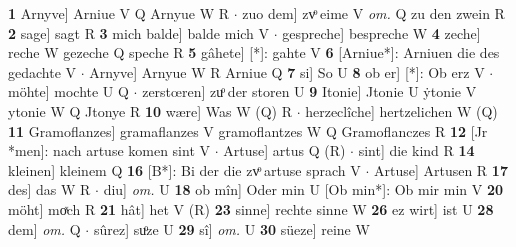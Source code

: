 \documentclass[8pt,a4paper,notitlepage]{article}
\begin{document}
\begin{table}[ht]
\begin{minipage}[t]{0.5\linewidth}
\textbf{1} Arnyve] Arniue V Q Arnyue W R  $\cdot$ zuo dem] zvͦ eime V \textit{om.} Q zu den zwein R \textbf{2} sage] sagt R \textbf{3} mich balde] balde mich V  $\cdot$ gespreche] bespreche W \textbf{4} zeche] reche W gezeche Q speche R \textbf{5} gâhete] [*]: gahte V \textbf{6} [Arniue*]: Arniuen die des gedachte V  $\cdot$ Arnyve] Arnyue W R Arniue Q \textbf{7} si] So U \textbf{8} ob er] [*]: Ob erz V  $\cdot$ möhte] mochte U Q  $\cdot$ zerstœren] zuͦ der storen U \textbf{9} Itonie] Jtonie U ẏtonie V ytonie W Q Jtonye R \textbf{10} wære] Was W (Q) R  $\cdot$ herzeclîche] hertzelichen W (Q) \textbf{11} Gramoflanzes] gramaflanzes V gramoflantzes W Q Gramoflanczes R \textbf{12} [Jr *men]: nach artuse komen sint V  $\cdot$ Artuse] artus Q (R)  $\cdot$ sint] die kind R \textbf{14} kleinen] kleinem Q \textbf{16} [B*]: Bi der die zvͦ artuse sprach V  $\cdot$ Artuse] Artusen R \textbf{17} des] das W R  $\cdot$ diu] \textit{om.} U \textbf{18} ob mîn] Oder min U [Ob min*]: Ob mir min V \textbf{20} möht] moͯch R \textbf{21} hât] het V (R) \textbf{23} sinne] rechte sinne W \textbf{26} ez wirt] ist U \textbf{28} dem] \textit{om.} Q  $\cdot$ sûrez] suͦze U \textbf{29} sî] \textit{om.} U \textbf{30} süeze] reine W \newline
\end{minipage}
\end{table}
\end{document}

